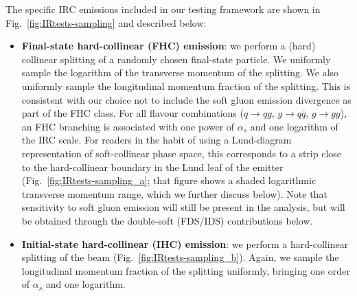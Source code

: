 \documentclass[nofootinbib,twocolumn,preprintnumbers,superscriptaddress,aps]{revtex4-2}
\newcommand{\as}{\alpha_s}
\begin{document}
The specific IRC emissions included in our testing framework are shown in Fig.~\ref{fig:IRtests-sampling} and described below:
%
\begin{itemize}
%
\item \textbf{Final-state hard-collinear (FHC) emission}:
  we perform a (hard) collinear splitting of a randomly chosen final-state
  particle.
  We uniformly sample the logarithm of the transverse momentum of the
  splitting.
  We also uniformly sample the longitudinal momentum fraction of the
  splitting.
  This is consistent with our choice not to include the soft gluon emission
  divergence as part of the FHC class.
  For all flavour
  combinations ($q \to qg$, $g \to q\bar q$, $g \to gg$), an FHC
  branching is associated with one power of $\as$ and one logarithm of
  the IRC scale.
  For readers in the habit of using a
  Lund-diagram~\cite{Andersson:1988gp} representation of
  soft-collinear phase space, this corresponds to a strip close to the
  hard-collinear boundary in the Lund leaf of the emitter
  (Fig.~\ref{fig:IRtests-sampling_a}; that figure shows a shaded
  logarithmic transverse momentum range, which we further discuss below).
  Note that sensitivity to soft gluon emission will still be present
  in the analysis, but will be obtained through the double-soft
  (FDS/IDS) contributions below.
  
  
\item \textbf{Initial-state hard-collinear (IHC) emission}:
  we perform a hard-collinear splitting
  of the beam (Fig.~\ref{fig:IRtests-sampling_b}).
  Again, we sample the longitudinal momentum fraction of the splitting
  uniformly, bringing one order of $\as$ and one logarithm.


\end{itemize}
\end{document}
